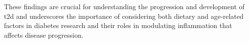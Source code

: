 \par These findings are crucial for understanding the progression and development of \gls{t2d} and underscores the importance of considering both dietary and age-related factors in diabetes research and their roles in modulating inflammation that affects disease progression.\\



\newpage\null\thispagestyle{empty}




